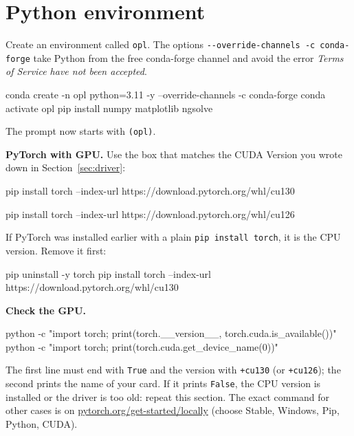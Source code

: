 \documentclass[11pt,a4paper]{article}
\newcommand{\code}[1]{\lstinline{#1}}
\begin{document}
\section{Python environment}\label{sec:env}

Create an environment called \code{opl}. The options \code{--override-channels -c conda-forge}
take Python from the free conda-forge channel and avoid the error
\emph{Terms of Service have not been accepted}.

\begin{cmd}
conda create -n opl python=3.11 -y --override-channels -c conda-forge
conda activate opl
pip install numpy matplotlib ngsolve
\end{cmd}

The prompt now starts with \code{(opl)}.

\textbf{PyTorch with GPU.} Use the box that matches the CUDA Version you wrote down in
Section~\ref{sec:driver}:

\begin{cmd}
pip install torch --index-url https://download.pytorch.org/whl/cu130
\end{cmd}
\begin{cmd}
pip install torch --index-url https://download.pytorch.org/whl/cu126
\end{cmd}

If PyTorch was installed earlier with a plain \code{pip install torch}, it is the CPU version.
Remove it first:

\begin{cmd}
pip uninstall -y torch
pip install torch --index-url https://download.pytorch.org/whl/cu130
\end{cmd}

\textbf{Check the GPU.}

\begin{cmd}
python -c "import torch; print(torch.__version__, torch.cuda.is_available())"
python -c "import torch; print(torch.cuda.get_device_name(0))"
\end{cmd}

The first line must end with \code{True} and the version with \code{+cu130} (or \code{+cu126});
the second prints the name of your card. If it prints \code{False}, the CPU version is
installed or the driver is too old: repeat this section.
The exact command for other cases is on
\href{https://pytorch.org/get-started/locally/}{pytorch.org/get-started/locally}
(choose Stable, Windows, Pip, Python, CUDA).
\end{document}
